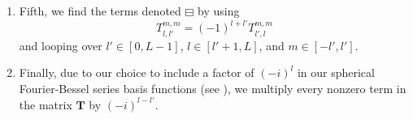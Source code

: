\begin{enumerate}
\item Fifth, we find the terms denoted $\boxminus$ by using \citep[Eq.~(162)]{Zotter2009PhD}
\begin{equation}\label{eq:A1_Navigation_Filters:z_Translation_l_Symmetry}
T_{l,l'}^{m,m} = (-1)^{l + l'} T_{l',l}^{m,m}
\end{equation} %
and looping over $l' \in [0,L - 1]$, $l \in [l' + 1,L]$, and $m \in [-l',l']$.

\item Finally, due to our choice to include a factor of $(-i)^l$ in our spherical Fourier-Bessel series basis functions (see ), we multiply every nonzero term in the matrix $\mathbf{T}$ by $(-i)^{l-l'}$.

\end{enumerate}